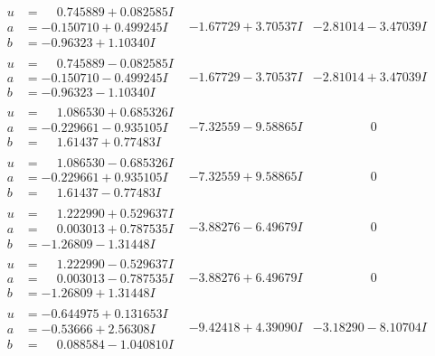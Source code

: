 \documentclass[1p]{elsarticle_modified}
\theoremstyle{definition}
\begin{document}
$$\begin{array}{c|c|c}
\begin{aligned}
u &= \phantom{-}0.745889 + 0.082585 I \\
a &= -0.150710 + 0.499245 I \\
b &= -0.96323 + 1.10340 I\end{aligned}
 & -1.67729 + 3.70537 I & -2.81014 - 3.47039 I \\ \hline\begin{aligned}
u &= \phantom{-}0.745889 - 0.082585 I \\
a &= -0.150710 - 0.499245 I \\
b &= -0.96323 - 1.10340 I\end{aligned}
 & -1.67729 - 3.70537 I & -2.81014 + 3.47039 I \\ \hline\begin{aligned}
u &= \phantom{-}1.086530 + 0.685326 I \\
a &= -0.229661 - 0.935105 I \\
b &= \phantom{-}1.61437 + 0.77483 I\end{aligned}
 & -7.32559 - 9.58865 I & \phantom{-0.000000 } 0 \\ \hline\begin{aligned}
u &= \phantom{-}1.086530 - 0.685326 I \\
a &= -0.229661 + 0.935105 I \\
b &= \phantom{-}1.61437 - 0.77483 I\end{aligned}
 & -7.32559 + 9.58865 I & \phantom{-0.000000 } 0 \\ \hline\begin{aligned}
u &= \phantom{-}1.222990 + 0.529637 I \\
a &= \phantom{-}0.003013 + 0.787535 I \\
b &= -1.26809 - 1.31448 I\end{aligned}
 & -3.88276 - 6.49679 I & \phantom{-0.000000 } 0 \\ \hline\begin{aligned}
u &= \phantom{-}1.222990 - 0.529637 I \\
a &= \phantom{-}0.003013 - 0.787535 I \\
b &= -1.26809 + 1.31448 I\end{aligned}
 & -3.88276 + 6.49679 I & \phantom{-0.000000 } 0 \\ \hline\begin{aligned}
u &= -0.644975 + 0.131653 I \\
a &= -0.53666 + 2.56308 I \\
b &= \phantom{-}0.088584 - 1.040810 I\end{aligned}
 & -9.42418 + 4.39090 I & -3.18290 - 8.10704 I \\ \hline\begin{aligned}

\end{aligned}
\end{array}$$
\end{document}
